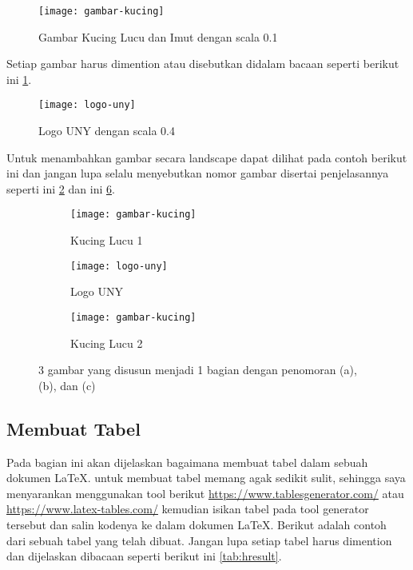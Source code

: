 \begin{figure}[H]
    \centering
    \texttt{[image: gambar-kucing]}
    \caption{Gambar Kucing Lucu dan Imut dengan scala 0.1}
    \label{fig:kucing}
\end{figure}

Setiap gambar harus dimention atau disebutkan didalam bacaan seperti berikut ini \cref{fig:kucing}.

\begin{figure}[H]
    \centering
    \texttt{[image: logo-uny]}
    \caption{Logo UNY dengan scala 0.4}
    \label{fig:logoUNY}
\end{figure}

Untuk menambahkan gambar secara landscape dapat dilihat pada contoh berikut ini dan jangan lupa selalu menyebutkan nomor gambar disertai penjelasannya seperti ini \cref{fig:logoUNY} dan ini \cref{fig:kucingdanUNY}.

\begin{figure}
	\centering
	\begin{subfigure}[b]{0.3\textwidth}
		\centering
		\texttt{[image: gambar-kucing]}
		\caption{Kucing Lucu 1}
		\label{fig:kucing-a}
	\end{subfigure}
	\hfill
	\begin{subfigure}[b]{0.3\textwidth}
		\centering
		\texttt{[image: logo-uny]}
		\caption{Logo UNY}
		\label{fig:logo-uny-b}
	\end{subfigure}
	\hfill
	\begin{subfigure}[b]{0.3\textwidth}
		\centering
		\texttt{[image: gambar-kucing]}
		\caption{Kucing Lucu 2}
		\label{fig:kucing-c}
	\end{subfigure}
	   \caption{3 gambar yang disusun menjadi 1 bagian dengan penomoran (a), (b), dan (c)}
	   \label{fig:kucingdanUNY}
\end{figure}

\subsection{Membuat Tabel}
Pada bagian ini akan dijelaskan bagaimana membuat tabel dalam sebuah dokumen \LaTeX. untuk membuat tabel memang agak sedikit sulit, sehingga saya menyarankan menggunakan tool berikut \url{https://www.tablesgenerator.com/} atau \url{https://www.latex-tables.com/} kemudian isikan tabel pada tool generator tersebut dan salin kodenya ke dalam dokumen \LaTeX. Berikut adalah contoh dari sebuah tabel yang telah dibuat. Jangan lupa setiap tabel harus dimention dan dijelaskan dibacaan seperti berikut ini \cref{tab:hresult}.

